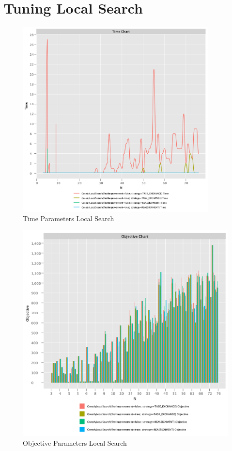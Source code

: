 \documentclass{article}
\begin{document}
\newpage

\section{Tuning Local Search}

\begin{figure}[!h]
    \centering
    \includegraphics[width=0.9\textwidth]{./documentation/assets/localSearchParams.timeChart.pdf}
    \caption{Time Parameters Local Search}
    \label{fig:local_time}
\end{figure}\FloatBarrier

\begin{figure}
    \centering
    \includegraphics[width=1\textwidth]{./documentation/assets/localSearchParams.objectiveChart.pdf}
    \caption{Objective Parameters Local Search}
    \label{fig:local_objective}
\end{figure}\FloatBarrier
\end{document}
